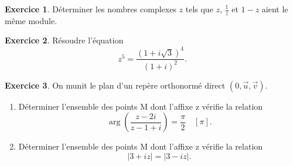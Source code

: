 \documentclass[a4paper, 11pt,openany]{article}%
\theoremstyle{plain}
\theoremstyle{definition}
\newtheorem{exo}{Exercice}
\newtheorem{sol}{Solution de l'exercice}
\theoremstyle{remark}
\newcommand{\Z}{\mathbb{Z}}
\begin{document}
\begin{exo}
Déterminer les nombres complexes $z$ tels que $z$, $\frac{1}{z}$ et $1-z$ aient le même module.
\end{exo}


\begin{exo}
Résoudre l'équation
\[ z^5 = \frac{(1+i \sqrt{3})^4}{(1+i)^2}.\]
\end{exo}
%



\begin{exo}
On munit le plan d'un repère orthonormé direct $(0,\overrightarrow{u},\overrightarrow{v})$.
\begin{enumerate}
\item Déterminer l'ensemble des points M dont l'affixe z vérifie la relation
\[ \arg \left( \frac{z-2i}{z-1+i} \right) = \frac{\pi}{2} \quad [\pi].\]
\item Déterminer l'ensemble des points M dont l'affixe z vérifie la relation
\[ |3 +iz| = |3-iz|.\]
\end{enumerate}
\end{exo}
\end{document}

